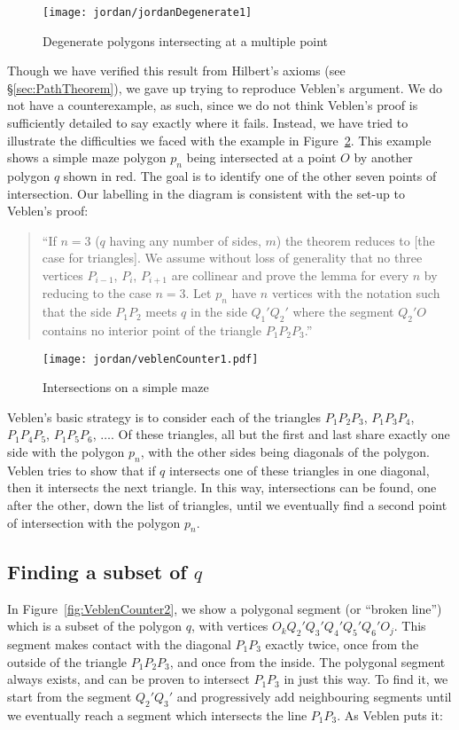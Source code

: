 \begin{figure}
\centering
\texttt{[image: jordan/jordanDegenerate1]}
\caption{Degenerate polygons intersecting at a multiple point}
\label{fig:jordanDegenerate1}
\end{figure}

Though we have verified this result from Hilbert's axioms (see \S\ref{sec:PathTheorem}), we gave up trying to reproduce Veblen's argument. We do not have a counterexample, as such, since we do not think Veblen's proof is sufficiently detailed to say exactly where it fails. Instead, we have tried to illustrate the difficulties we faced with the example in Figure~\ref{fig:VeblenCounter1}. This example shows a simple maze polygon $p_n$ being intersected at a point $O$ by another polygon $q$ shown in red. The goal is to identify one of the other seven points of intersection. Our labelling in the diagram is consistent with the set-up to Veblen's proof:

\begin{quote}
``If $n=3$ ($q$ having any number of sides, $m$) the theorem reduces to [the case for triangles]. We assume without loss of generality that no three vertices $P_{i-1}$, $P_i$, $P_{i+1}$ are collinear and prove the lemma for every $n$ by reducing to the case $n=3$. Let $p_n$ have $n$ vertices with the notation such that the side $P_1P_2$ meets $q$ in the side $Q_1'Q_2'$ where the segment $Q_2'O$ contains no interior point of the triangle $P_1P_2P_3$.''
\end{quote}

\begin{figure}
\centering
\texttt{[image: jordan/veblenCounter1.pdf]}
\caption{Intersections on a simple maze}
\label{fig:VeblenCounter1}
\end{figure}

Veblen's basic strategy is to consider each of the triangles $P_1P_2P_3$, $P_1P_3P_4$, $P_1P_4P_5$, $P_1P_5P_6$, $\ldots$. Of these triangles, all but the first and last share exactly one side with the polygon $p_n$, with the other sides being diagonals of the polygon. Veblen tries to show that if $q$ intersects one of these triangles in one diagonal, then it intersects the next triangle. In this way, intersections can be found, one after the other, down the list of triangles, until we eventually find a second point of intersection with the polygon $p_n$.

\subsection{Finding a subset of $q$}\label{sec:SubsetOfQ}
In Figure~\ref{fig:VeblenCounter2}, we show a polygonal segment  (or ``broken line'') which is a subset of the polygon $q$, with vertices $O_kQ_2'Q_3'Q_4'Q_5'Q_6'O_j$. This segment makes contact with the diagonal $P_1P_3$ exactly twice, once from the outside of the triangle $P_1P_2P_3$, and once from the inside. The polygonal segment always exists, and can be proven to intersect $P_1P_3$ in just this way. To find it, we start from the segment $Q_2'Q_3'$ and progressively add neighbouring segments until we eventually reach a segment which intersects the line $P_1P_3$. As Veblen puts it:

